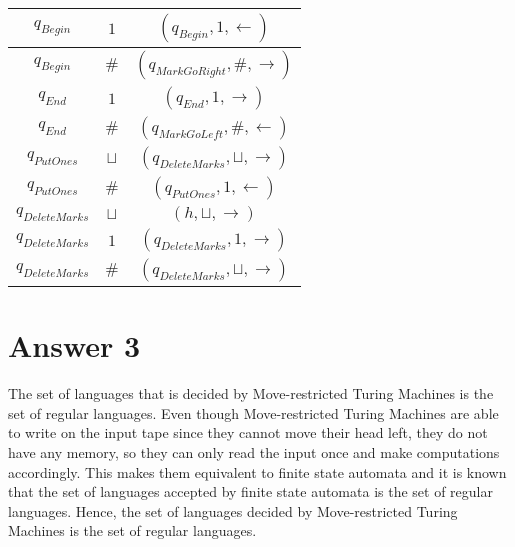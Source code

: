 \documentclass[12pt]{article}
\begin{document}
\begin{table}[H]
\begin{center}
\begin{tabular}{ | c | c | c | }
\hline
$q_{Begin}$ & $1$ & $(q_{Begin}, 1, \leftarrow)$\\
\hline
$q_{Begin}$ & $\#$ & $(q_{MarkGoRight}, \#, \rightarrow)$\\
\hline
$q_{End}$ & $1$ & $(q_{End}, 1, \rightarrow)$\\
\hline
$q_{End}$ & $\#$ & $(q_{MarkGoLeft}, \#, \leftarrow)$\\
\hline
$q_{PutOnes}$ & $\sqcup$ & $(q_{DeleteMarks}, \sqcup, \rightarrow)$\\
\hline
$q_{PutOnes}$ & $\#$ & $(q_{PutOnes}, 1, \leftarrow)$\\
\hline
$q_{DeleteMarks}$ & $\sqcup$ & $(h, \sqcup, \rightarrow)$\\
\hline
$q_{DeleteMarks}$ & $1$ & $(q_{DeleteMarks}, 1, \rightarrow)$\\
\hline
$q_{DeleteMarks}$ & $\#$ & $(q_{DeleteMarks}, \sqcup, \rightarrow)$\\
\hline
\end{tabular}
\end{center}
\end{table}

\section*{Answer 3}
The set of languages that is decided by Move-restricted Turing Machines is the set of regular languages. Even though Move-restricted Turing Machines are able to write on the input tape since they cannot move their head left, they do not have any memory, so they can only read the input once and make computations accordingly. This makes them equivalent to finite state automata and it is known that the set of languages accepted by finite state automata is the set of regular languages. Hence, the set of languages decided by Move-restricted Turing Machines is the set of regular languages.
\end{document}
